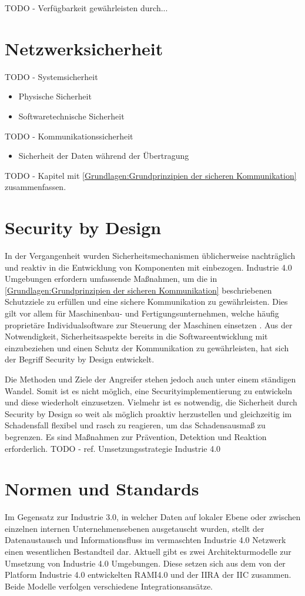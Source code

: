 TODO - Verfügbarkeit gewährleisten durch...

\section{Netzwerksicherheit}
TODO - Systemsicherheit
\begin{itemize}
  \item Physische Sicherheit
  \item Softwaretechnische Sicherheit
\end{itemize}

TODO - Kommunikationssicherheit
\begin{itemize}
  \item Sicherheit der Daten während der Übertragung
\end{itemize}

TODO - Kapitel mit \autoref{Grundlagen:Grundprinzipien der sicheren Kommunikation} zusammenfassen.

\section{Security by Design}
In der Vergangenheit wurden Sicherheitsmechanismen üblicherweise nachträglich und reaktiv in die Entwicklung von Komponenten mit einbezogen. Industrie 4.0 Umgebungen erfordern umfassende Maßnahmen, um die in \autoref{Grundlagen:Grundprinzipien der sicheren Kommunikation} beschriebenen Schutzziele zu erfüllen und eine sichere Kommunikation zu gewährleisten. Dies gilt vor allem für Maschinenbau- und Fertigungsunternehmen, welche häufig proprietäre Individualsoftware zur Steuerung der Maschinen einsetzen \cite{DTAG2016}. Aus der Notwendigkeit, Sicherheitsaspekte bereits in die Softwareentwicklung mit einzubeziehen und einen Schutz der Kommunikation zu gewährleisten, hat sich der Begriff Security by Design entwickelt.

Die Methoden und Ziele der Angreifer stehen jedoch auch unter einem ständigen Wandel. Somit ist es nicht möglich, eine Securityimplementierung zu entwickeln und diese wiederholt einzusetzen. Vielmehr ist es notwendig, die Sicherheit durch Security by Design so weit als möglich proaktiv herzustellen und gleichzeitig im Schadensfall flexibel und rasch zu reagieren, um das Schadensausmaß zu begrenzen. Es sind Maßnahmen zur Prävention, Detektion und Reaktion erforderlich. TODO - ref. Umsetzungsstrategie Industrie 4.0

\section{Normen und Standards}
\label{Grundlagen:Normen und Standards}
Im Gegensatz zur Industrie 3.0, in welcher Daten auf lokaler Ebene oder zwischen einzelnen internen Unternehmensebenen ausgetauscht wurden, stellt der Datenaustausch und Informationsfluss im vermaschten Industrie 4.0 Netzwerk einen wesentlichen Bestandteil dar. Aktuell gibt es zwei Architekturmodelle zur Umsetzung von Industrie 4.0 Umgebungen. Diese setzen sich aus dem von der Platform Industrie 4.0 entwickelten \ac{RAMI4.0} und der \ac{IIRA} der \ac{IIC} zusammen. Beide Modelle verfolgen verschiedene Integrationsansätze.

